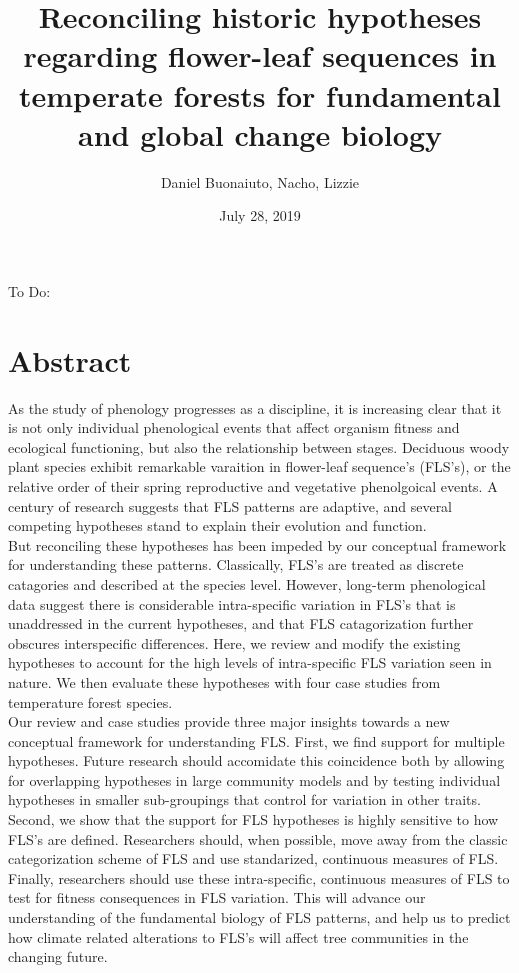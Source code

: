 \documentclass[12pt]{article}\usepackage[]{graphicx}\usepackage[]{color}
\title{Reconciling historic hypotheses regarding flower-leaf sequences in temperate forests for fundamental and global change biology}
\author{Daniel Buonaiuto, Nacho, Lizzie}
\date{July 28, 2019}
\begin{document}
\maketitle
To Do:
\begin{enumerate}
\end{enumerate}
\section*{Abstract}

\indent\indent As the study of phenology progresses as a discipline, it is increasing clear that it is not only individual phenological events that affect organism fitness and ecological functioning, but also the relationship between stages.  Deciduous woody plant species exhibit remarkable varaition in flower-leaf  sequence's (FLS's), or the relative order of their spring reproductive and vegetative phenolgoical events. A century of research suggests that FLS patterns are adaptive, and several competing hypotheses stand to explain their evolution and function. \\
\indent But reconciling these hypotheses has been impeded by our conceptual framework for understanding these patterns. Classically, FLS's are treated as discrete catagories and described at the species level. However, long-term phenological data suggest there is considerable intra-specific variation in FLS's that is unaddressed in the current hypotheses, and that FLS catagorization further obscures interspecific differences.
Here, we review and modify the existing hypotheses to account for the high levels of intra-specific FLS variation seen in nature. We then evaluate these hypotheses with four case studies from temperature forest species.\\ 
 \indent Our review and case studies provide three major insights towards a new conceptual framework for understanding FLS. First, we find support for multiple hypotheses. Future research should accomidate this coincidence both by allowing for overlapping hypotheses in large community models and by testing individual hypotheses in smaller sub-groupings that control for variation in other traits. %
Second, we show that the support for FLS hypotheses is highly sensitive to how FLS's are defined. Researchers should, when possible, move away from the classic categorization scheme of FLS and use standarized, continuous measures of FLS. Finally, researchers should use these intra-specific, continuous measures of FLS to test for fitness consequences in FLS variation. This will advance our understanding of the fundamental biology of FLS patterns, and help us to predict how climate related alterations to FLS's will affect tree communities in the changing future.
\end{document}
